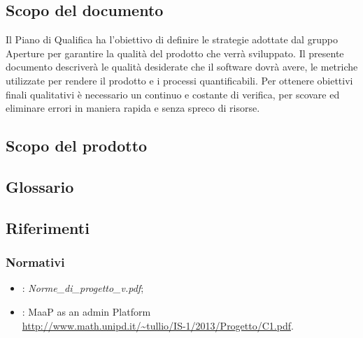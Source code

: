 \subsection{Scopo del documento}%
\label{1.1}
Il Piano di Qualifica ha l'obiettivo di definire le strategie adottate dal gruppo Aperture  per garantire la qualità del prodotto che verrà sviluppato.
Il presente documento descriverà le qualità desiderate che il software dovrà avere, le metriche utilizzate per rendere il prodotto e i processi quantificabili. Per ottenere obiettivi finali qualitativi è necessario un continuo e costante  di verifica, per scovare ed eliminare errori in maniera rapida e senza spreco di risorse.

\subsection{Scopo del prodotto}%
\label{1.2}
\Prodotto{}

\subsection{Glossario}%
\label{1.3}
\Glossario{}

\subsection{Riferimenti} %
\label{1.4}
\subsubsection{Normativi}
\label{1.4.1}
\begin{itemize}
\item {}: \emph{Norme\_di\_progetto\_v\versioneNormeDiProgetto{}.pdf};\\
\item {}: MaaP as an admin Platform\\
\url{http://www.math.unipd.it/~tullio/IS-1/2013/Progetto/C1.pdf}.
\end{itemize}
